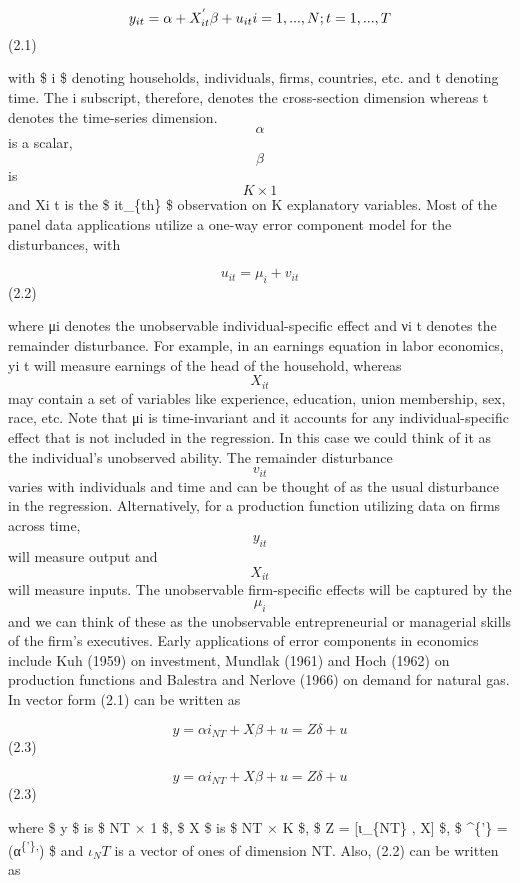\documentclass[
]{book}
\begin{document}
\begin{equation}
 y_{it}= \alpha + X_{it}^{'} \beta + u_{it}                      $$ $$ i=1, ... , N  ; t=1, ... ,T 
 \end{equation}(2.1)

with \$ i \$ denoting households, individuals, firms, countries, etc. and t denoting time. The i subscript, therefore, denotes the cross-section dimension whereas t denotes the time-series dimension. \[ \alpha  \] is a scalar, \[ \beta \] is \[ K × 1 \] and Xi t is the \$ it\_\{th\} \$ observation on K explanatory variables. Most of the panel data applications utilize a one-way error component model for the disturbances, with

\[ u_{it}= \mu_i +  v_{it}      \] (2.2)

where μi denotes the unobservable individual-specific effect and νi t denotes the remainder disturbance. For example, in an earnings equation in labor economics, yi t will measure earnings of the head of the household, whereas \[ X_{it} \] may contain a set of variables like experience, education, union membership, sex, race, etc. Note that μi is time-invariant and it accounts for any individual-specific effect that is not included in the regression. In this case we could think of it as the individual's unobserved ability. The remainder disturbance \[ v_{it} \] varies with individuals and time and can be thought of as the usual disturbance in the regression. Alternatively, for a production function utilizing data on firms across time, \[ y_{it} \] will measure output and \[ X_{it} \] will measure inputs. The unobservable firm-specific effects will be captured by the \[ \mu_i \] and we can think of these as the unobservable entrepreneurial or managerial skills of the firm's executives. Early applications of error components in economics include Kuh (1959) on investment, Mundlak (1961) and Hoch (1962) on production functions and Balestra and Nerlove (1966) on demand for natural gas. In vector form (2.1) can be written as

\begin{equation} y= \alpha i_{NT} + X \beta + u = Z \delta + u     \end{equation} (2.3)

\begin{equation} y= \alpha i_{NT} + X \beta + u = Z \delta + u      \end{equation} (2.3)

where \$ y \$ is \$ NT × 1 \$, \$ X \$ is \$ NT × K \$, \$ Z = {[}ι\_\{NT\} , X{]} \$, \$ \delta\^{}\{'\} = (α\textsuperscript{\{'\},}) \$ and \(ι_NT\) is a vector of ones of dimension NT. Also, (2.2) can be written as
\end{document}
